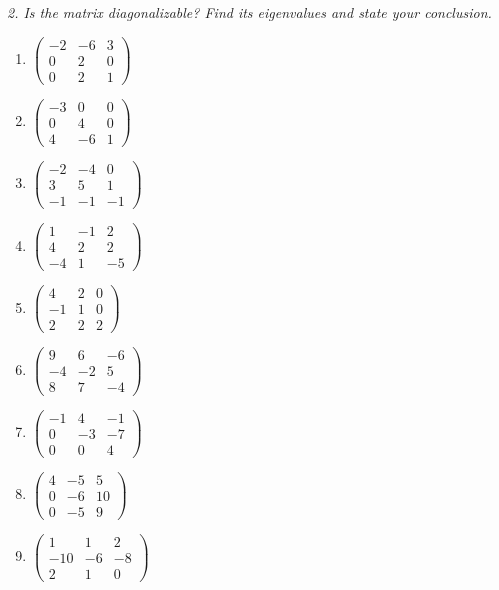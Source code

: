 \emph{2. Is the matrix diagonalizable? Find its eigenvalues and state your conclusion.}
\bigskip
\begin{enumerate}[label=\arabic*., leftmargin=*]
\item $\begin{pmatrix}-2 & -6 & 3\\ 0 & 2 & 0\\ 0 & 2 & 1\end{pmatrix}$
\item $\begin{pmatrix}-3 & 0 & 0\\ 0 & 4 & 0\\ 4 & -6 & 1\end{pmatrix}$
\item $\begin{pmatrix}-2 & -4 & 0\\ 3 & 5 & 1\\ -1 & -1 & -1\end{pmatrix}$
\item $\begin{pmatrix}1 & -1 & 2\\ 4 & 2 & 2\\ -4 & 1 & -5\end{pmatrix}$
\item $\begin{pmatrix}4 & 2 & 0\\ -1 & 1 & 0\\ 2 & 2 & 2\end{pmatrix}$
\item $\begin{pmatrix}9 & 6 & -6\\ -4 & -2 & 5\\ 8 & 7 & -4\end{pmatrix}$
\item $\begin{pmatrix}-1 & 4 & -1\\ 0 & -3 & -7\\ 0 & 0 & 4\end{pmatrix}$
\item $\begin{pmatrix}4 & -5 & 5\\ 0 & -6 & 10\\ 0 & -5 & 9\end{pmatrix}$
\item $\begin{pmatrix}1 & 1 & 2\\ -10 & -6 & -8\\ 2 & 1 & 0\end{pmatrix}$

\end{enumerate}
